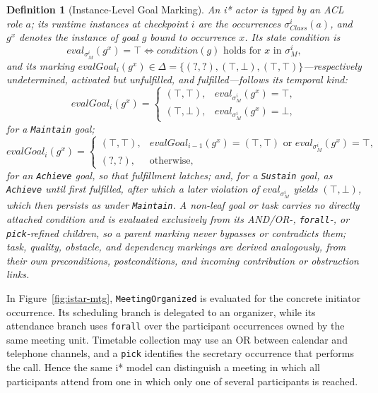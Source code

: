 \documentclass[a4paper, conference]{IEEEtran}
\newtheorem{definition}{Definition}
\begin{document}
\begin{definition}[Instance-Level Goal Marking]
\label{def:goal-marking}
An i* actor is typed by an ACL role $a$; its runtime instances at checkpoint $i$ are the occurrences $\sigma_{\mathit{Class}}^i(a)$, and $g^x$ denotes the instance of goal $g$ bound to occurrence $x$. Its state condition is
\[
\mathit{eval}_{\sigma_M^i}(g^x)=\top \iff \mathit{condition}(g)\text{ holds for }x\text{ in }\sigma_M^i,
\]
and its marking $\mathit{evalGoal}_i(g^x)\in\Delta=\{(?,?),(\top,\bot),(\top,\top)\}$---respectively undetermined, activated but unfulfilled, and fulfilled---follows its temporal kind:
\[
\mathit{evalGoal}_i(g^x)=
\begin{cases}
(\top,\top), & \mathit{eval}_{\sigma_M^i}(g^x)=\top,\\
(\top,\bot), & \mathit{eval}_{\sigma_M^i}(g^x)=\bot,
\end{cases}
\]
for a \texttt{Maintain} goal;
\[
\mathit{evalGoal}_i(g^x)=
\begin{cases}
(\top,\top), & \mathit{evalGoal}_{i-1}(g^x)=(\top,\top) \text{ or } \mathit{eval}_{\sigma_M^i}(g^x)=\top,\\
(?,?), & \text{otherwise},
\end{cases}
\]
for an \texttt{Achieve} goal, so that fulfillment latches; and, for a \texttt{Sustain} goal, as \texttt{Achieve} until first fulfilled, after which a later violation of $\mathit{eval}_{\sigma_M^i}$ yields $(\top,\bot)$, which then persists as under \texttt{Maintain}. A non-leaf goal or task carries no directly attached condition and is evaluated exclusively from its AND/OR-, \texttt{forall}-, or \texttt{pick}-refined children, so a parent marking never bypasses or contradicts them; task, quality, obstacle, and dependency markings are derived analogously, from their own preconditions, postconditions, and incoming contribution or obstruction links.
\end{definition}

In Figure~\ref{fig:istar-mtg}, \texttt{MeetingOrganized} is evaluated for the concrete initiator occurrence. Its scheduling branch is delegated to an organizer, while its attendance branch uses \texttt{forall} over the participant occurrences owned by the same meeting unit. Timetable collection may use an OR between calendar and telephone channels, and a \texttt{pick} identifies the secretary occurrence that performs the call. Hence the same i* model can distinguish a meeting in which all participants attend from one in which only one of several participants is reached.
\end{document}
